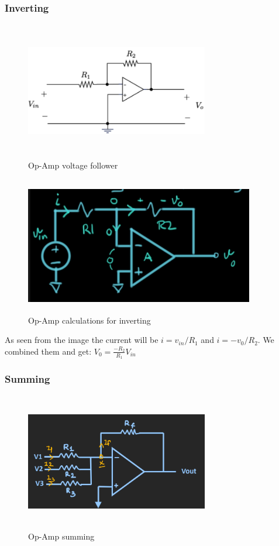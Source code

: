 \subsubsection{Inverting}
\begin{figure}[h]
    \vspace{10mm}
    \centering
    \includegraphics[width=8cm, height=6cm]{image/op-amp-inverting.png}
    \caption{Op-Amp voltage follower}
\end{figure}

\begin{figure}[h]
    \vspace{10mm}
    \centering
    \includegraphics[width=10cm, height=6cm]{image/op-amp-calc-inverting.png}
    \caption{Op-Amp calculations for inverting}
\end{figure}
As seen from the image the current will be $i=v_{in}/R_1$ and $i=-v_0/R_2$. We combined them and get:
$V_0=\frac{-R_2}{R_1}V_{in}$

\newpage
\subsubsection{Summing}
\begin{figure}[h]
    \vspace{10mm}
    \centering
    \includegraphics[width=8cm, height=6cm]{image/op-amp-summing.png}
    \caption{Op-Amp summing}
\end{figure}

